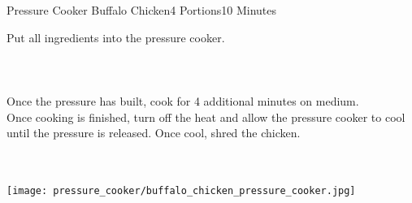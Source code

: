 \begin{recipe}{Pressure Cooker Buffalo Chicken}{4 Portions}{10 Minutes}

Put all ingredients into the pressure cooker.\\~\\~\\~\\

\newstep
Once the pressure has built, cook for 4 additional minutes on medium.\\

\newstep
Once cooking is finished, turn off the heat and allow the pressure cooker to cool until the pressure is released. Once cool, shred the chicken.

\end{recipe}

\begin{center}
~\\~\\
\texttt{[image: pressure\_cooker/buffalo\_chicken\_pressure\_cooker.jpg]}
\end{center}